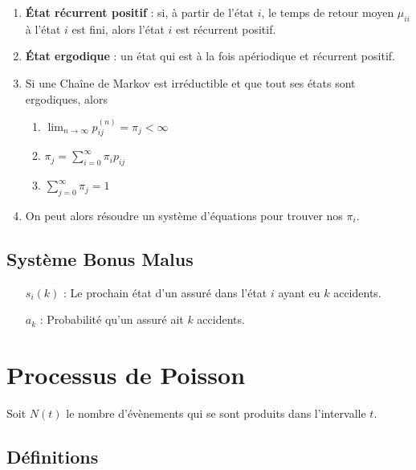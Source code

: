 \documentclass[10pt, french]{article}
\begin{document}
\begin{multicols*}{2}
\begin{enumerate}[label=\faAngleRight]
\item \textbf{État récurrent positif} : si, à partir de l'état $i$, le temps de retour moyen $\mu_{ii}$ à l'état $i$ est fini, alors l'état $i$ est récurrent positif.

\item \textbf{État ergodique} : un état qui est à la fois apériodique et récurrent positif.

\item Si une Chaîne de Markov est irréductible et que tout ses états sont ergodiques, alors
\begin{enumerate}[label=(\arabic*)]
	\item $	\lim_{n \to \infty} p_{ij}^{(n)} = \pi_j < \infty$
	\item $\pi_j = \sum_{i=0}^{\infty} \pi_i p_{ij}$
	\item $\sum_{j=0}^{\infty} \pi_j = 1$
\end{enumerate}

\item On peut alors résoudre un système d'équations pour trouver nos $\pi_i$.
\end{enumerate}

\subsection*{Système Bonus Malus}

\begin{enumerate}
	\item[$s_{i}(k)$ : ] Le prochain état d'un assuré dans l'état $i$ ayant eu $k$ accidents.
	\item[$a_{k}$ : ] Probabilité qu'un assuré ait $k$ accidents.
\end{enumerate}

\section{Processus de Poisson}
Soit $N(t)$ le nombre d'évènements qui se sont produits dans l'intervalle $t$.

\subsection*{Définitions}


\end{multicols*}
\end{document}
